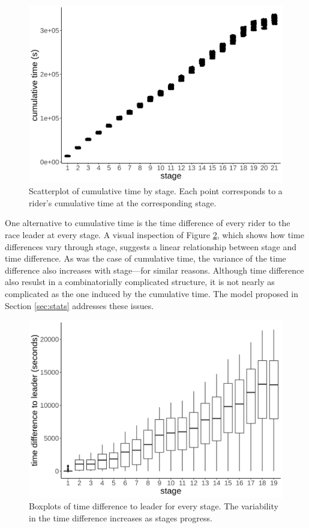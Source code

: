 \documentclass[aos,preprint]{imsart}
\begin{document}
\begin{figure}[h]
  \centering
  \includegraphics[scale=0.6]{fig/cumtime_stage.png}
  \caption{Scatterplot of cumulative time by stage. Each point corresponds to a rider's cumulative time at the corresponding stage.}
  \label{fig:cumtime}
\end{figure}


One alternative to cumulative time is the time difference of every rider to the race leader at every stage. A visual inspection of Figure \ref{fig:timediff_stage}, which shows how time differences vary through stage, suggests a linear relationship between stage and time difference. As was the case of cumulative time, the variance of the time difference also increases with stage---for similar reasons. Although time difference also resulst in a combinatorially complicated structure, it is not nearly as complicated as the one induced by the cumulative time. The model proposed in Section \ref{sec:stats} addresses these issues. \\



\begin{figure}[h]
  \centering
  \includegraphics[scale=0.6]{fig/timediff_stage.png}
  \caption{Boxplots of time difference to leader for every stage. The variability in the time difference increases as stages progress.}
  \label{fig:timediff_stage}
\end{figure}
\end{document}
